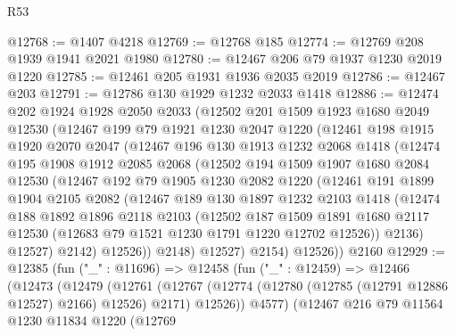 \begin{lexlean}{R53}
\begin{coremodule}
@12768 := @1407 @4218
@12769 := @12768 @185
@12774 := @12769 @208 @1939 @1941 @2021 @1980
@12780 := @12467 @206 @79 @1937 @1230 @2019 @1220
@12785 := @12461 @205 @1931 @1936 @2035 @2019
@12786 := @12467 @203
@12791 := @12786 @130 @1929 @1232 @2033 @1418
@12886 := @12474
    @202
    @1924
    @1928
    @2050
    @2033
    (@12502
      @201
      @1509
      @1923
      @1680
      @2049
      @12530
      (@12467
        @199
        @79
        @1921
        @1230
        @2047
        @1220
        (@12461
          @198
          @1915
          @1920
          @2070
          @2047
          (@12467
            @196
            @130
            @1913
            @1232
            @2068
            @1418
            (@12474
              @195
              @1908
              @1912
              @2085
              @2068
              (@12502
                @194
                @1509
                @1907
                @1680
                @2084
                @12530
                (@12467
                  @192
                  @79
                  @1905
                  @1230
                  @2082
                  @1220
                  (@12461
                    @191
                    @1899
                    @1904
                    @2105
                    @2082
                    (@12467
                      @189
                      @130
                      @1897
                      @1232
                      @2103
                      @1418
                      (@12474
                        @188
                        @1892
                        @1896
                        @2118
                        @2103
                        (@12502
                          @187
                          @1509
                          @1891
                          @1680
                          @2117
                          @12530
                          (@12683 @79 @1521 @1230 @1791 @1220 @12702 @12526))
                        @2136)
                      @12527)
                    @2142)
                  @12526))
              @2148)
            @12527)
          @2154)
        @12526))
    @2160
@12929 := @12385
    (fun ("_" : @11696) =>
    @12458
      (fun ("_" : @12459) =>
      @12466
        (@12473
          (@12479
            (@12761
              (@12767 (@12774 (@12780 (@12785 (@12791 @12886 @12527) @2166) @12526) @2171) @12526))
            @4577)
          (@12467
            @216
            @79
            @11564
            @1230
            @11834
            @1220
            (@12769

\end{coremodule}
\end{lexlean}
